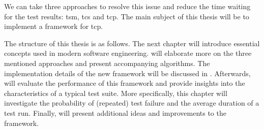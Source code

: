 \noindent We can take three approaches to resolve this issue and reduce the time waiting for the test results: \acrfull{tsm}, \acrfull{tcs} and \acrfull{tcp}. The main subject of this thesis will be to implement a framework for \acrshort{tcp}.

\noindent The structure of this thesis is as follows. The next chapter will introduce essential concepts used in modern software engineering.  will elaborate more on the three mentioned approaches and present accompanying algorithms. The implementation details of the new framework will be discussed in . Afterwards,  will evaluate the performance of this framework and provide insights into the characteristics of a typical test suite. More specifically, this chapter will investigate the probability of (repeated) test failure and the average duration of a test run. Finally,  will present additional ideas and improvements to the framework.